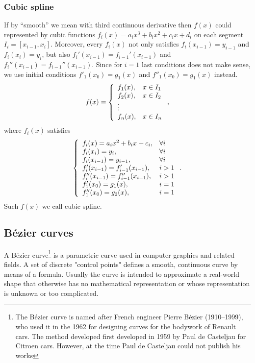 \subsubsection*{Cubic spline}
If by ``smooth'' we mean with third continuous derivative then $f(x)$ could represented by cubic functions $f_i(x)=a_ix^3+b_ix^2+c_ix+d_i$ on each segment $I_i = [x_{i-1}, x_i]$. Moreover, every $f_i(x)$ not only satisfies $f_i(x_{i-1})=y_{i-1}$ and $f_i(x_{i})=y_i$, but also $f_i'(x_{i-1})=f_{i-1}'(x_{i-1})$ and $f_i''(x_{i-1})=f_{i-1}''(x_{i-1})$. Since for $i=1$ last conditions does not make sense, we use initial conditions $f'_1(x_{0}) = g_1(x)$ and $f''_1(x_{0}) = g_1(x)$ instead. 
\[
    f(x) = 
    \left\{ 
    \begin{array}{l l}
        f_1(x), & x \in I_1\\
        f_2(x), & x \in I_2\\
        \vdots \\
        f_n(x), & x \in I_n
    \end{array}
    \right.,
\]
where $f_i(x)$ satisfies
\[
    \left\{
    \begin{array}{l l}
        f_i(x) = a_ix^2+b_ix+c_i, & \forall i\\
        f_i(x_i) = y_i, & \forall i\\
        f_i(x_{i-1}) = y_{i-1}, & \forall i\\
        f'_i(x_{i-1}) = f'_{i-1}(x_{i-1}), & i>1\\
        f''_i(x_{i-1}) = f''_{i-1}(x_{i-1}), & i>1\\
        f'_1(x_{0}) = g_1(x), & i=1\\
        f''_1(x_{0}) = g_2(x), & i=1
    \end{array}  
    \right..
\]
Such $f(x)$ we call cubic spline. 
\newpage
\subsection*{Bézier curves}

 A Bézier curve\footnote{The Bézier curve is named after French engineer Pierre Bézier (1910–1999), who used it in the 1962 for designing curves for the bodywork of Renault cars. The method developed first developed in 1959 by Paul de Casteljau for Citroen cars. However, at the time Paul de Casteljau could not publish his works} is a parametric curve used in computer graphics and related fields. A set of discrete "control points" defines a smooth, continuous curve by means of a formula. Usually the curve is intended to approximate a real-world shape that otherwise has no mathematical representation or whose representation is unknown or too complicated. 
 

